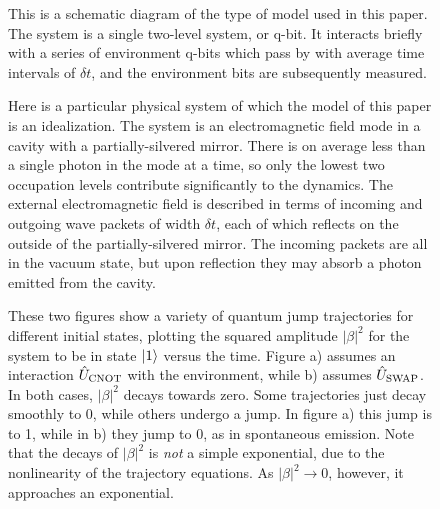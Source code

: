 \eject
\vfil

\begin{figure}
\begin{center}
\label{fig1}
\end{center}
\caption{This is a schematic diagram of the type of model used in
this paper.  The system is a single two-level system, or q-bit.  It
interacts briefly with a series of environment q-bits which pass by
with average time intervals of $\delta t$, and the environment bits
are subsequently measured.}
\end{figure}

\eject
\vfil

\begin{figure}
\begin{center}
\label{fig2}
\end{center}
\caption{Here is a particular physical system of which the model
of this paper is an idealization.  The system is an electromagnetic
field mode in a cavity with a partially-silvered mirror.  There is on
average less than a single photon in the mode at a time, so only the
lowest two occupation levels contribute significantly to the dynamics.
The external electromagnetic field is described in terms of incoming
and outgoing wave packets of width $\delta t$, each of which reflects
on the outside of the partially-silvered mirror.  The incoming packets
are all in the vacuum state, but upon reflection they may absorb a
photon emitted from the cavity.}
\end{figure}

\eject
\vfil

\begin{figure}
\begin{center}
\label{fig3}
\end{center}
\caption{These two figures show a variety of quantum jump trajectories
for different initial states, plotting the squared amplitude $|\beta|^2$
for the system to be in state ${| 1 \rangle}$ versus the time.
Figure a) assumes an interaction
${\hat U}_{\rm CNOT}$ with the environment, while b) assumes ${\hat U}_{\rm SWAP}$.
In both cases, $|\beta|^2$ decays towards zero.  Some trajectories just
decay smoothly to 0, while others undergo a jump.  In figure a) this
jump is to 1, while in b) they jump to 0, as in spontaneous emission.
Note that the decays of $|\beta|^2$ is {\it not} a simple exponential,
due to the nonlinearity of the trajectory equations.  As
$|\beta|^2 \rightarrow 0$, however, it approaches an exponential.}
\end{figure}

